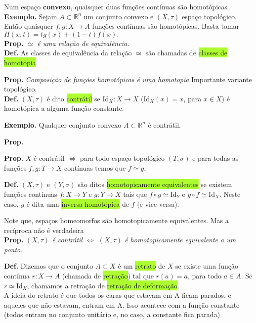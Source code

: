 \documentclass{article}
\begin{document}
\begin{landscape}
\begin{multicols}{3}
\color{blue!70} Num espaço \textbf{convexo}, quaisquer duas funções contínuas são homotópicas\color{black}\\
\textbf{Exemplo.} Sejam \( A \subset \mathbb{R}^n \) um conjunto convexo e \( (X, \tau) \) espaço topológico. Então quaisquer \( f, g : X \to A \) funções contínuas são homotópicas. Basta tomar 
$H(x,t) = t g(x) + (1 - t) f(x).$\\

\textbf{Prop.} \( \simeq \) \textit{é uma relação de equivalência.}\\

\textbf{Def.} As classes de equivalência da relação \( \simeq \) são chamadas de \colorbox{GreenYellow}{classes de homotopia}.

\textbf{Prop.} \textit{Composição de funções homotópicas é uma homotopia}\medskip
\color{blue!70}Importante variante topológico.\color{black}\\
\textbf{Def.} \( (X, \tau) \) é dito \colorbox{GreenYellow}{contrátil} se \( \mathrm{Id}_X : X \to X \) (\( \mathrm{Id}_X(x) = x \), para \( x \in X \)) é homotópica a alguma função constante.\medskip

\textbf{Exemplo.} Qualquer conjunto convexo \( A \subset \mathbb{R}^n \) é contrátil.\medskip

\textbf{Prop. } \medskip

\textbf{Prop. } $X$ é contrátil $\Leftrightarrow$ para todo espaço topológico $(T, \sigma)$ e para todas as funções $f,g:T\to X$ contínuas temos que $f\simeq g$.\medskip

\textbf{Def.} \( (X, \tau) \) e \( (Y, \sigma) \) são ditos \colorbox{GreenYellow}{homotopicamente equivalentes} se existem funções contínuas \( f : X \to Y \) e \( g : Y \to X \) tais que \( f \circ g \simeq \mathrm{Id}_Y \) e \( g \circ f \simeq \mathrm{Id}_X \). Neste caso, \( g \) é dita uma \colorbox{GreenYellow}{inversa homotópica} de \( f \) (e vice-versa).\medskip

\color{blue!70}Note que, espaços homeomorfos são homotopicamente equivalentes. Mas a recíproca não é verdadeira\color{black}\\
\textbf{Prop.} \textit{\( (X, \tau) \) é contrátil $\Leftrightarrow$ \( (X, \tau) \) é homotopicamente equivalente a um ponto.}\medskip


\textbf{Def.} Dizemos que o conjunto \( A \subset X \) é um \colorbox{GreenYellow}{retrato} de \( X \) se existe uma função contínua \( r : X \to A \) (chamada de \colorbox{GreenYellow}{retração}) tal que \( r(a) = a \), para todo \( a \in A \). Se \( r \simeq \mathrm{Id}_X \), chamamos a retração de \colorbox{GreenYellow}{retração de deformação}.\\
\color{gray}A ideia do retrato é que todos os caras que estavam em A ficam parados, e aqueles que não estavam, entram em A. Isso acontece com a função constante (todos entram no conjunto unitário e, no caso, a constante fica parada)\color{black}


\end{multicols}
\end{landscape}
\end{document}
